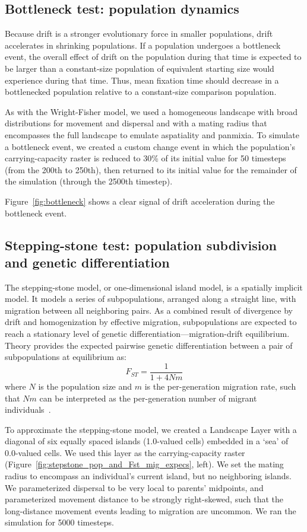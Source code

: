 ﻿\documentclass{article}
\begin{document}
\subsection{Bottleneck test: population dynamics}
Because drift is a stronger evolutionary force in smaller populations,
drift accelerates in shrinking populations. 
If a population undergoes a bottleneck event, the overall effect of drift on the population
during that time is expected to be larger than a constant-size population of equivalent
starting size would experience during that time. 
Thus, mean fixation time should decrease in a bottlenecked population
relative to a constant-size comparison population.

As with the Wright-Fisher model, we used a homogeneous landscape with broad distributions
for movement and dispersal and with a mating radius that encompasses the full landscape
to emulate aspatiality and panmixia. To simulate a bottleneck event,
we created a custom change event in which the population's carrying-capacity raster
is reduced to 30\% of its initial value for 50 timesteps (from the 200th to 250th),
then returned to its initial value for the remainder of the simulation
(through the 2500th timestep).

Figure~\ref{fig:bottleneck} shows a clear signal of drift acceleration during the bottleneck event.


\subsection{Stepping-stone test: population subdivision and genetic differentiation}
The stepping-stone model, or one-dimensional island model, is a spatially implicit model.
It models a series of subpopulations, arranged along a straight line,
with migration between all neighboring pairs.
As a combined result of divergence by drift and homogenization
by effective migration, subpopulations are expected to reach
a stationary level of genetic differentiation---migration-drift equilibrium. 
Theory provides the expected pairwise genetic differentiation
between a pair of subpopulations at equilibrium as:
\begin{equation}
        F_{ST} = \frac{1}{1 + 4Nm}
\label{eqxn:F_ST_as_fn_of_mig}
\end{equation}
where $N$ is the population size and $m$ is the per-generation migration rate,
such that $Nm$ can be interpreted as the per-generation number of migrant
individuals~\cite{hartl}.

To approximate the stepping-stone model, we created a Landscape Layer with a diagonal
of six equally spaced islands (1.0-valued cells) embedded in a `sea' of 0.0-valued cells.
We used this layer as the carrying-capacity raster (Figure~\ref{fig:stepstone_pop_and_Fst_mig_expecs}, left).
We set the mating radius to encompass an individual's current island, but no neighboring islands.
We parameterized dispersal to be very local to parents' midpoints, and
parameterized movement distance to be strongly right-skewed, such that
the long-distance movement events leading to migration are uncommon.
We ran the simulation for 5000 timesteps.
\end{document}
